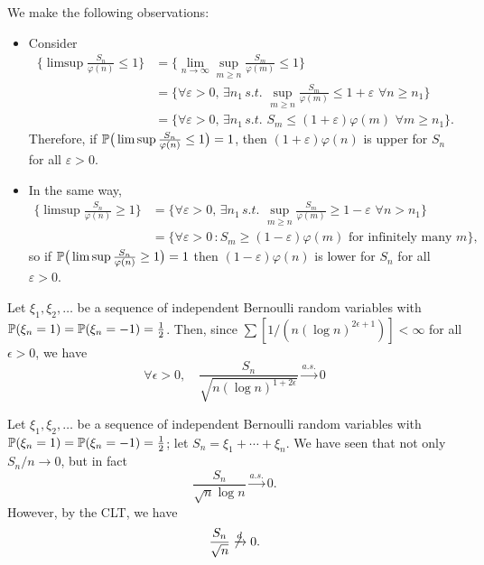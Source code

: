 We make the following observations:
\begin{itemize}
\item Consider
\begin{align*}
    \bigg\{ \limsup \frac{S_n}{\varphi(n)} \le 1 \bigg\}
    &= \bigg\{ \lim_{n \to \infty} \sup_{m \ge n} \frac{S_m}{\varphi(m)} \le 1\bigg\}\\
    &= \bigg\{ \forall \varepsilon > 0, \, \exists n_1 \, s.t. \, \, \sup_{m \ge n} \frac{S_m}{\varphi(m)} \le 1 + \varepsilon \, \, \forall n \ge n_1 \bigg\}\\
    &= \bigg\{ \forall \varepsilon > 0, \, \exists n_1 \, s.t. \,\, S_m \le (1 + \varepsilon) \varphi(m) \, \, \forall m \ge n_1 \bigg\}.
\end{align*}
Therefore, if $\mathbb{P} \big(\limsup \frac{S_n}{\varphi(n)} \le 1\big) = 1$, then $(1 + \varepsilon) \varphi(n)$ is upper for $S_n$ for all $\varepsilon > 0$.
\item In the same way,
\begin{align*}
    \bigg \{ \limsup \frac{S_n}{\varphi(n)} \ge 1 \bigg\}
    &= \bigg\{ \forall \varepsilon > 0, \, \exists n_1 \, s.t. \, \, \sup_{m \ge n}\frac{S_m}{\varphi(m)} \ge 1 - \varepsilon \, \, \forall n > n_1 \bigg\}\\
    &= \bigg\{ \forall \varepsilon > 0 \, : S_m \ge (1 - \varepsilon) \varphi(m) \, \, \text{for infinitely many }m \bigg\},
\end{align*}
so if $\mathbb{P}\big( \limsup \frac{S_n}{\varphi(n)} \ge 1 \big) = 1$ then $(1 - \varepsilon)\varphi(n)$ is lower for $S_n$ for all $\varepsilon > 0$.
\end{itemize}

\begin{example}
Let $\xi_1, \xi_2, \dots$ be a sequence of independent Bernoulli random variables with $\mathbb{P}(\xi_n = 1) = \mathbb{P}(\xi_n = -1) = \frac12$. Then, since $\sum [1/(n (\log n)^{2\epsilon + 1})] < \infty$ for all $\epsilon > 0$, we have
\begin{equation*}
    \forall \epsilon > 0, \quad \frac{S_n}{\sqrt{n (\log n)^{1+2\epsilon}}} \xrightarrow{a.s.} 0
\end{equation*}
\end{example}

Let $\xi_1, \xi_2, \dots$ be a sequence of independent Bernoulli random variables with $\mathbb{P}(\xi_n = 1) = \mathbb{P}(\xi_n = -1) = \frac12$; let $S_n = \xi_1 + \cdots + \xi_n$. We have seen that not only $S_n/n \to 0$, but in fact
\begin{equation*}
    \frac{S_n}{\sqrt{n}\log n} \xrightarrow{a.s.} 0.
\end{equation*}
However, by the CLT, we have
\begin{equation*}
    \frac{S_n}{\sqrt{n}} \not\xrightarrow{d} 0.
\end{equation*}

